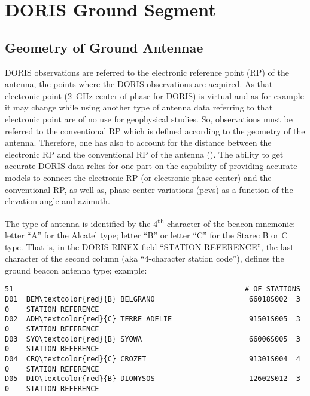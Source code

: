 \section{DORIS Ground Segment}\label{sec:doris-ground-segment}

\subsection{Geometry of Ground Antennae}\label{ssec:antenae-geometry}
DORIS observations are referred to the electronic reference point (RP) of the 
antenna, the points where the DORIS observations  are  acquired.  As that 
electronic  point (\SI{2}{\GHz} center of phase for DORIS) is virtual and as 
for example it may change while using another type of antenna data referring 
to that electronic point are of no use for geophysical studies. So, 
observations must be referred to the conventional RP which is defined 
according to the geometry of the antenna. Therefore, one has also to account 
for the distance between the electronic RP and the conventional RP of the 
antenna (\cite{TOURAIN2016}). The ability to get accurate DORIS data relies 
for one part on the capability of providing accurate models to connect the 
electronic RP (or electronic phase center) and the conventional RP, as well 
as, phase center variations (\glspl{pcv}) as a function of the elevation angle 
and azimuth.

The type of antenna is identified by the 4\textsuperscript{th} character of 
the beacon mnemonic: letter ``A'' for the Alcatel type; letter ``B'' or letter 
``C'' for the Starec B or C type.  That is, in the DORIS RINEX field 
``STATION REFERENCE'', the last character of the second column (aka 
``4-character station code''), defines the ground beacon antenna type; 
example:

\begin{adjustbox}{max width=\linewidth , fbox=0.5pt}
\begin{BVerbatim}[commandchars=\\\{\}]
    51                                                      # OF STATIONS       
D01  BEM\textcolor{red}{B} BELGRANO                      66018S002  3   0    STATION REFERENCE   
D02  ADH\textcolor{red}{C} TERRE ADELIE                  91501S005  3   0    STATION REFERENCE   
D03  SYQ\textcolor{red}{B} SYOWA                         66006S005  3   0    STATION REFERENCE   
D04  CRQ\textcolor{red}{C} CROZET                        91301S004  4   0    STATION REFERENCE   
D05  DIO\textcolor{red}{B} DIONYSOS                      12602S012  3   0    STATION REFERENCE
\end{BVerbatim}
\end{adjustbox}

